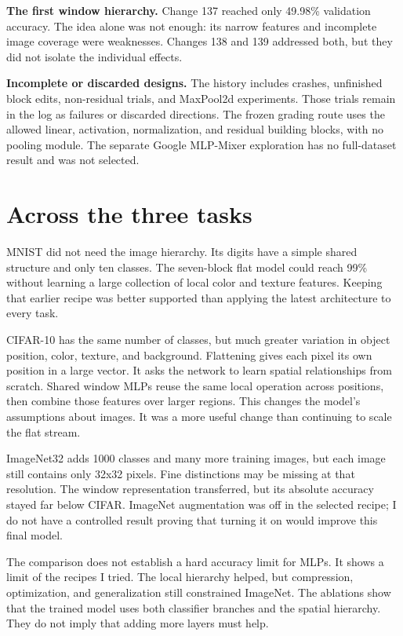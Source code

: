 \documentclass[journal,10pt,letterpaper]{IEEEtran}
\begin{document}
\textbf{The first window hierarchy.} Change 137 reached only 49.98\% validation accuracy. The idea alone was not enough: its narrow features and incomplete image coverage were weaknesses. Changes 138 and 139 addressed both, but they did not isolate the individual effects.

\textbf{Incomplete or discarded designs.} The history includes crashes, unfinished block edits, non-residual trials, and MaxPool2d experiments. Those trials remain in the log as failures or discarded directions. The frozen grading route uses the allowed linear, activation, normalization, and residual building blocks, with no pooling module. The separate Google MLP-Mixer exploration has no full-dataset result and was not selected.



\section{Across the three tasks}

MNIST did not need the image hierarchy. Its digits have a simple shared structure and only ten classes. The seven-block flat model could reach 99\% without learning a large collection of local color and texture features. Keeping that earlier recipe was better supported than applying the latest architecture to every task.

CIFAR-10 has the same number of classes, but much greater variation in object position, color, texture, and background. Flattening gives each pixel its own position in a large vector. It asks the network to learn spatial relationships from scratch. Shared window MLPs reuse the same local operation across positions, then combine those features over larger regions. This changes the model's assumptions about images. It was a more useful change than continuing to scale the flat stream.

ImageNet32 adds 1000 classes and many more training images, but each image still contains only 32x32 pixels. Fine distinctions may be missing at that resolution. The window representation transferred, but its absolute accuracy stayed far below CIFAR. ImageNet augmentation was off in the selected recipe; I do not have a controlled result proving that turning it on would improve this final model.

The comparison does not establish a hard accuracy limit for MLPs. It shows a limit of the recipes I tried. The local hierarchy helped, but compression, optimization, and generalization still constrained ImageNet. The ablations show that the trained model uses both classifier branches and the spatial hierarchy. They do not imply that adding more layers must help.
\end{document}
